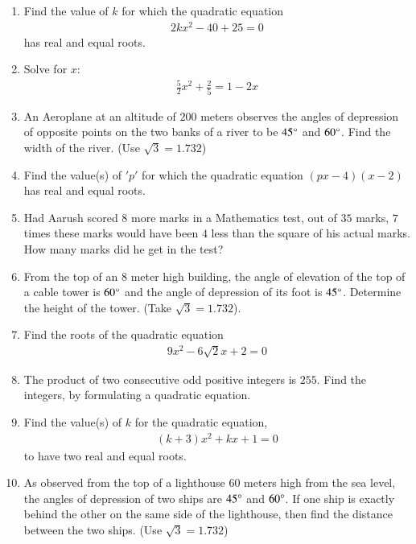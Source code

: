 \documentclass{article}
\theoremstyle{remark}
\begin{document}
\begin{enumerate}
    \item Find the value of $k$ for which the quadratic equation
    \begin{align}
        2kx^2 - 40 + 25 = 0
    \end{align}
    has real and equal roots.
    
    \item Solve for $x$:
    \begin{align}
        \frac{5}{2}x^2 + \frac{2}{5} = 1 - 2x
    \end{align}
    
    \item An Aeroplane at an altitude of $200$ meters observes the angles of depression of opposite points on the two banks of a river to be $45\degree$ and $60\degree$. Find the width of the river. (Use $\sqrt{3} = 1.732$)
    
    \item Find the value(s) of $'p'$ for which the quadratic equation $(px-4)(x-2)$ has real and equal roots.
    
    \item Had Aarush scored $8$ more marks in a Mathematics test, out of $35$ marks, $7$ times these marks would have been $4$ less than the square of his actual marks. How many marks did he get in the test?
    
    \item From the top of an $8$ meter high building, the angle of elevation of the top of a cable tower is $60\degree$ and the angle of depression of its foot is $45\degree$. Determine the height of the tower. (Take $\sqrt{3} = 1.732$).
    
    \item Find the roots of the quadratic equation 
    \begin{align}
        9x^2 - 6\sqrt{2}x + 2 = 0
    \end{align}
    
    \item The product of two consecutive odd positive integers is $255$. Find the integers, by formulating a quadratic equation.
    
    \item Find the value(s) of $k$ for the quadratic equation,
    \begin{align}
        (k+3)x^2 + kx + 1 = 0
    \end{align}
    to have two real and equal roots.
    
    \item As observed from the top of a lighthouse $60$ meters high from the sea level, the angles of depression of two ships are $45\degree$ and $60\degree$. If one ship is exactly behind the other on the same side of the lighthouse, then find the distance between the two ships. (Use $\sqrt{3} = 1.732$)
    

\end{enumerate}
\end{document}
